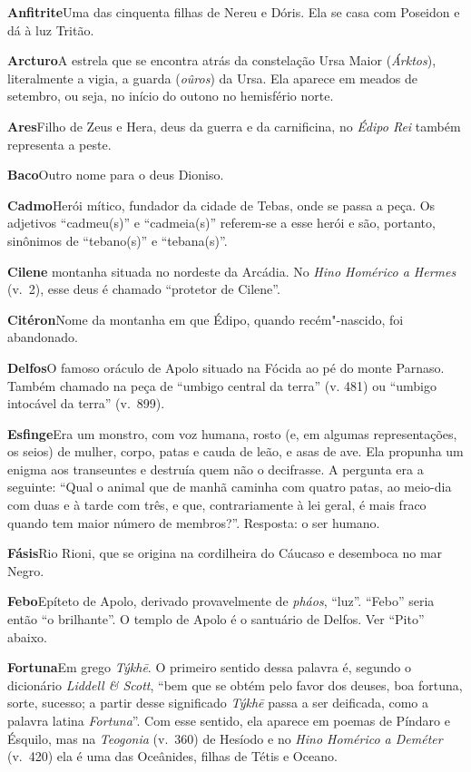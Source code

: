 \textbf{Anfitrite}\quad Uma das cinquenta filhas de Nereu e Dóris. Ela se
casa com Poseidon e dá à luz Tritão.

\textbf{Arcturo}\quad A estrela que se encontra atrás da constelação Ursa
Maior (\emph{Árktos}), literalmente a vigia, a guarda (\emph{oûros}) da
Ursa. Ela aparece em meados de setembro, ou seja, no início do outono no
hemisfério norte.

\textbf{Ares}\quad Filho de Zeus e Hera, deus da guerra e da carnificina,
no \emph{Édipo Rei} também representa a peste.

\textbf{Baco}\quad Outro nome para o deus Dioniso.

\textbf{Cadmo}\quad Herói mítico, fundador da cidade de Tebas, onde se
passa a peça. Os adjetivos ``cadmeu(s)'' e ``cadmeia(s)'' referem-se a
esse herói e são, portanto, sinônimos de ``tebano(s)'' e ``tebana(s)''.

\textbf{Cilene\quad} montanha situada no nordeste da Arcádia. No
\emph{Hino Homérico a Hermes} (v.~2), esse deus é chamado ``protetor de
Cilene''.

\textbf{Citéron}\quad Nome da montanha em que Édipo, quando
recém"-nascido, foi abandonado.

\textbf{Delfos}\quad O famoso oráculo de Apolo situado na Fócida ao pé do
monte Parnaso. Também chamado na peça de ``umbigo central da terra'' (v.
481) ou ``umbigo intocável da terra'' (v.~899).

\textbf{Esfinge}\quad Era um monstro, com voz humana, rosto (e, em
algumas representações, os seios) de mulher, corpo, patas e cauda de
leão, e asas de ave. Ela propunha um enigma aos transeuntes e destruía
quem não o decifrasse. A pergunta era a seguinte: ``Qual o animal que de
manhã caminha com quatro patas, ao meio-dia com duas e à tarde com três,
e que, contrariamente à lei geral, é mais fraco quando tem maior número
de membros?''. Resposta: o ser humano.

\textbf{Fásis}\quad Rio Rioni, que se origina na cordilheira do Cáucaso
e desemboca no mar Negro.

\textbf{Febo}\quad Epíteto de Apolo, derivado provavelmente de
\emph{pháos}, ``luz''. ``Febo'' seria então ``o brilhante''. O templo de
Apolo é o santuário de Delfos. Ver ``Pito'' abaixo.

\textbf{Fortuna}\quad Em grego \emph{Týkhē}. O primeiro sentido dessa
palavra é, segundo o dicionário \emph{Liddell \& Scott}, ``bem que se
obtém pelo favor dos deuses, boa fortuna, sorte, sucesso; a partir desse
significado \emph{Týkhē} passa a ser deificada, como a palavra latina
\emph{Fortuna}''. Com esse sentido, ela aparece em poemas de Píndaro e
Ésquilo, mas na \emph{Teogonia} (v.~360) de Hesíodo e no \emph{Hino
Homérico a Deméter} (v.~420) ela é uma das Oceânides, filhas de Tétis e
Oceano.

